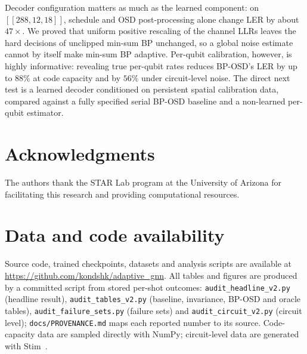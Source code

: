 \documentclass[a4paper,twocolumn,11pt,nopdfoutputerror]{quantumarticle}
\newcommand{\code}[3]{\ensuremath{[\![#1,#2,#3]\!]}}
\begin{document}
Decoder configuration matters as much as the learned component: on
$\code{288}{12}{18}$, schedule and OSD post-processing alone change LER by
about $47\times$. We proved that uniform positive rescaling of the channel
LLRs leaves the hard decisions of unclipped min-sum BP unchanged, so a
global noise estimate cannot by itself make min-sum BP adaptive. Per-qubit
calibration, however, is highly informative: revealing true per-qubit
rates reduces BP-OSD's LER by up to $88\%$ at code capacity and by $56\%$
under circuit-level noise. The direct next test is a learned decoder
conditioned on persistent spatial calibration data, compared against a
fully specified serial BP-OSD baseline and a non-learned per-qubit
estimator.

\section*{Acknowledgments}

The authors thank the STAR Lab program at the University of Arizona
for facilitating this research and providing computational resources.

\section*{Data and code availability}

Source code, trained checkpoints, datasets and analysis scripts are
available at \url{https://github.com/kondshk/adaptive_gnn}.
All tables and figures are produced by a committed script from stored
per-shot outcomes: \texttt{audit\_headline\_v2.py} (headline result),
\texttt{audit\_tables\_v2.py} (baseline, invariance, BP-OSD and oracle
tables), \texttt{audit\_failure\_sets.py} (failure sets) and
\texttt{audit\_circuit\_v2.py} (circuit level); \texttt{docs/PROVENANCE.md}
maps each reported number to its source. Code-capacity data are sampled directly with NumPy;
circuit-level data are generated with Stim~\cite{Gidney2021Stim}.



\end{document}
